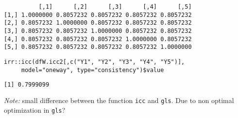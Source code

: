 \documentclass{article}
\begin{document}
\begin{verbatim}
          [,1]      [,2]      [,3]      [,4]      [,5]
[1,] 1.0000000 0.8057232 0.8057232 0.8057232 0.8057232
[2,] 0.8057232 1.0000000 0.8057232 0.8057232 0.8057232
[3,] 0.8057232 0.8057232 1.0000000 0.8057232 0.8057232
[4,] 0.8057232 0.8057232 0.8057232 1.0000000 0.8057232
[5,] 0.8057232 0.8057232 0.8057232 0.8057232 1.0000000
\end{verbatim}

\lstset{language=r,label= ,caption= ,captionpos=b,numbers=none}
\begin{lstlisting}
irr::icc(dfW.icc2[,c("Y1", "Y2", "Y3", "Y4", "Y5")],
	 model="oneway", type="consistency")$value
\end{lstlisting}

\begin{verbatim}
[1] 0.7999099
\end{verbatim}

\emph{Note:} small difference between the function \texttt{icc} and
\texttt{gls}. Due to non optimal optimization in \texttt{gls}?
\end{document}
